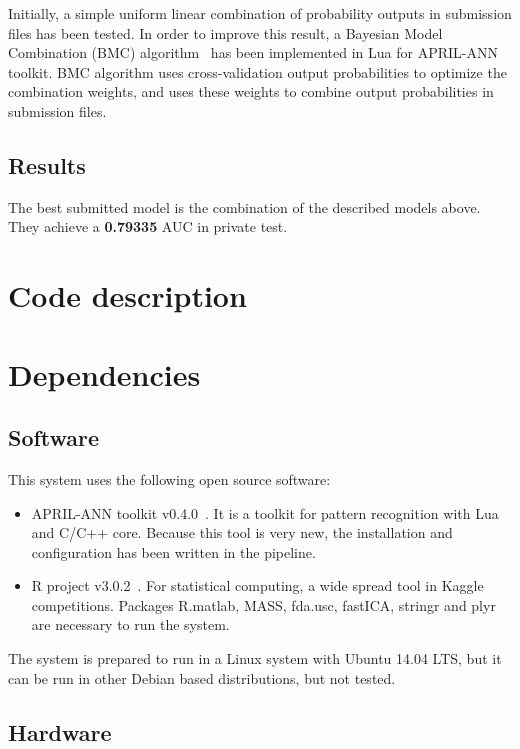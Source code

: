 \documentclass[a4paper,english,twoside]{article}
\begin{document}
Initially, a simple uniform linear combination of probability outputs in
submission files has been tested. In order to improve this result, a Bayesian
Model Combination (BMC) algorithm~\cite{2011:monteith:ijcnn} has been
implemented in Lua for APRIL-ANN~\cite{aprilann} toolkit. BMC algorithm uses
cross-validation output probabilities to optimize the combination weights, and
uses these weights to combine output probabilities in submission files.

\subsection{Results}\label{results}

The best submitted model is the combination of the described models
above. They achieve a \textbf{0.79335} AUC in private test.

\section{Code description}\label{code-description}

\section{Dependencies}\label{dependencies}

\subsection{Software}\label{software}

This system uses the following open source software:

\begin{itemize}
\item APRIL-ANN toolkit v0.4.0~\cite{aprilann}.
  It is a toolkit for pattern recognition with Lua and C/C++ core.
  Because this tool is very new, the installation and configuration has
  been written in the pipeline.
\item R project v3.0.2~\cite{Rproject}. For statistical
  computing, a wide spread tool in Kaggle competitions. Packages
  R.matlab, MASS, fda.usc, fastICA, stringr and plyr are necessary to
  run the system.
\end{itemize}

The system is prepared to run in a Linux system with Ubuntu 14.04 LTS, but it
can be run in other Debian based distributions, but not tested.

\subsection{Hardware}\label{hardware}
\end{document}
